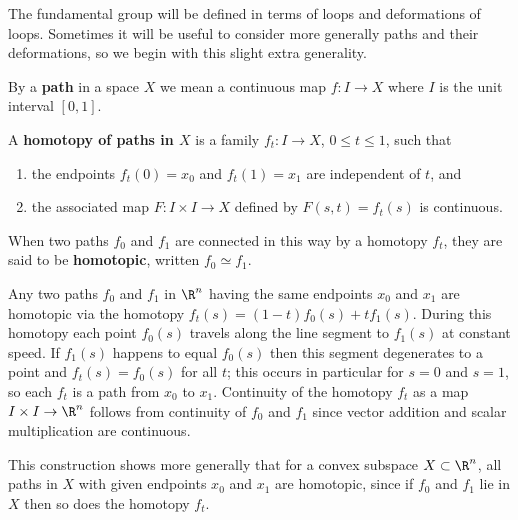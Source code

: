 The fundamental group will be defined in terms of loops and deformations of
loops. Sometimes it will be useful to consider more generally paths and their
deformations, so we begin with this slight extra generality.

\begin{definition}[Path]
\label{def:path}
By a \textbf{path} in a space $X$ we mean a continuous map $f : I \to X$ where $I$ is the
unit interval $[0,1]$.
\end{definition}

\begin{definition}
\label{def:homotopy-of-paths}
A \textbf{homotopy of paths in $X$} is a family $f_t : I \to X$, $0 \le t \le 1$, such that
\begin{enumerate}
\item[(1)] the endpoints $f_t(0) = x_0$ and $f_t(1) = x_1$ are independent of $t$, and
\item[(2)] the associated map $F : I \times I \to X$ defined by $F(s,t) = f_t(s)$ is continuous.
\end{enumerate}
When two paths $f_0$ and $f_1$ are connected in this way by a homotopy $f_t$, they are
said to be \textbf{homotopic}, written $f_0 \simeq f_1$.
\end{definition}



\begin{example}
\label{ex:linear-homotopies-convex}
Any two paths $f_0$ and $f_1$ in $\R^n$ having the same endpoints $x_0$ and $x_1$ are
homotopic via the homotopy $f_t(s) = (1-t)f_0(s) + t f_1(s)$. During this homotopy each
point $f_0(s)$ travels along the line segment to $f_1(s)$ at constant speed. If $f_1(s)$
happens to equal $f_0(s)$ then this segment degenerates to a point and $f_t(s) = f_0(s)$
for all $t$; this occurs in particular for $s=0$ and $s=1$, so each $f_t$ is a path from $x_0$
to $x_1$. Continuity of the homotopy $f_t$ as a map $I \times I \to \R^n$ follows from
continuity of $f_0$ and $f_1$ since vector addition and scalar multiplication are
continuous.

This construction shows more generally that for a convex subspace $X \subset \R^n$, all
paths in $X$ with given endpoints $x_0$ and $x_1$ are homotopic, since if $f_0$ and $f_1$
lie in $X$ then so does the homotopy $f_t$.
\end{example}

